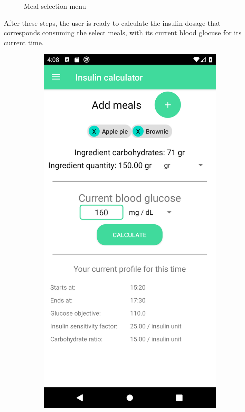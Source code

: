 \begin{figure}[H]
\begin{center}
        \caption{Meal selection menu}
    \end{center}
\end{figure}

After these steps, the user is ready to calculate the insulin dosage that corresponds consuming the select meals, with its current blood glocuse for its current time.

\begin{figure}[H]
    \captionsetup[subfigure]{justification=centering}
    \begin{center}
        \begin{subfigure}{.3\textwidth}
            \includegraphics[scale=0.1, width=\textwidth]{_figures/fullfilled_calc.png}

\end{subfigure}
\end{center}
\end{figure}
